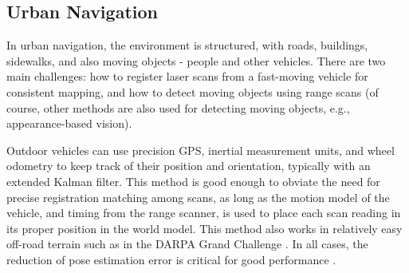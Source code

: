\documentclass[twocolumn,oneside]{book}
\begin{document}
%
%
%

\subsection{Urban Navigation}

In urban navigation, the environment is structured, with roads,
buildings, sidewalks, and also moving objects - people and other
vehicles.  There are two main challenges: how to register laser scans
from a fast-moving vehicle for consistent mapping, and how to detect
moving objects using range scans (of course, other methods are also
used for detecting moving objects, e.g., appearance-based vision).

Outdoor vehicles can use precision GPS, inertial measurement units,
and wheel odometry to keep track of their position and orientation,
typically with an extended Kalman filter.  This method is good enough
to obviate the need for precise registration matching among scans, as
long as the motion model of the vehicle, and timing from the range
scanner, is used to place each scan reading in its proper position in
the world model.  This method also works in relatively easy off-road
terrain such as in the DARPA Grand Challenge
\cite{GrandChallenge}.  In all cases, the reduction of pose
estimation error is critical for good performance
\cite{thrun06}. 
\end{document}
